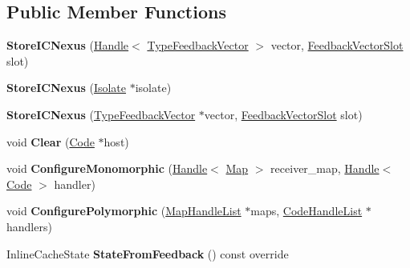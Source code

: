 \subsection*{Public Member Functions}
\begin{DoxyCompactItemize}
\item 
{\bfseries Store\+I\+C\+Nexus} (\hyperlink{classv8_1_1internal_1_1_handle}{Handle}$<$ \hyperlink{classv8_1_1internal_1_1_type_feedback_vector}{Type\+Feedback\+Vector} $>$ vector, \hyperlink{classv8_1_1internal_1_1_feedback_vector_slot}{Feedback\+Vector\+Slot} slot)\hypertarget{classv8_1_1internal_1_1_store_i_c_nexus_aa5ac27204ef88fd9279175dee12cf64c}{}\label{classv8_1_1internal_1_1_store_i_c_nexus_aa5ac27204ef88fd9279175dee12cf64c}

\item 
{\bfseries Store\+I\+C\+Nexus} (\hyperlink{classv8_1_1internal_1_1_isolate}{Isolate} $\ast$isolate)\hypertarget{classv8_1_1internal_1_1_store_i_c_nexus_ae56e53e34453257e6ecc74c47c68468e}{}\label{classv8_1_1internal_1_1_store_i_c_nexus_ae56e53e34453257e6ecc74c47c68468e}

\item 
{\bfseries Store\+I\+C\+Nexus} (\hyperlink{classv8_1_1internal_1_1_type_feedback_vector}{Type\+Feedback\+Vector} $\ast$vector, \hyperlink{classv8_1_1internal_1_1_feedback_vector_slot}{Feedback\+Vector\+Slot} slot)\hypertarget{classv8_1_1internal_1_1_store_i_c_nexus_a4d2a9d78dc4c9d54a7db73b91cec9ba0}{}\label{classv8_1_1internal_1_1_store_i_c_nexus_a4d2a9d78dc4c9d54a7db73b91cec9ba0}

\item 
void {\bfseries Clear} (\hyperlink{classv8_1_1internal_1_1_code}{Code} $\ast$host)\hypertarget{classv8_1_1internal_1_1_store_i_c_nexus_af3af501f509686a89b323b4fa6231348}{}\label{classv8_1_1internal_1_1_store_i_c_nexus_af3af501f509686a89b323b4fa6231348}

\item 
void {\bfseries Configure\+Monomorphic} (\hyperlink{classv8_1_1internal_1_1_handle}{Handle}$<$ \hyperlink{classv8_1_1internal_1_1_map}{Map} $>$ receiver\+\_\+map, \hyperlink{classv8_1_1internal_1_1_handle}{Handle}$<$ \hyperlink{classv8_1_1internal_1_1_code}{Code} $>$ handler)\hypertarget{classv8_1_1internal_1_1_store_i_c_nexus_a91b0fb51dbf35490e5fc34a4fa007518}{}\label{classv8_1_1internal_1_1_store_i_c_nexus_a91b0fb51dbf35490e5fc34a4fa007518}

\item 
void {\bfseries Configure\+Polymorphic} (\hyperlink{classv8_1_1internal_1_1_list}{Map\+Handle\+List} $\ast$maps, \hyperlink{classv8_1_1internal_1_1_list}{Code\+Handle\+List} $\ast$handlers)\hypertarget{classv8_1_1internal_1_1_store_i_c_nexus_ab04e10d1c3400c5eab670d031e7f422f}{}\label{classv8_1_1internal_1_1_store_i_c_nexus_ab04e10d1c3400c5eab670d031e7f422f}

\item 
Inline\+Cache\+State {\bfseries State\+From\+Feedback} () const  override\hypertarget{classv8_1_1internal_1_1_store_i_c_nexus_a875d9ae4d326d19a7a396f6a17e97652}{}\label{classv8_1_1internal_1_1_store_i_c_nexus_a875d9ae4d326d19a7a396f6a17e97652}

\end{DoxyCompactItemize}
